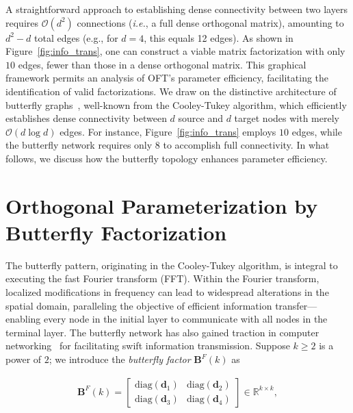 A straightforward approach to establishing dense connectivity between two layers requires $\mathcal{O}(d^2)$ connections (\emph{i.e.}, a full dense orthogonal matrix), amounting to $d^2-d$ total edges (e.g., for $d=4$, this equals 12 edges). As shown in Figure~\ref{fig:info_trans}, one can construct a viable matrix factorization with only $10$ edges, fewer than those in a dense orthogonal matrix. This graphical framework permits an analysis of OFT’s parameter efficiency, facilitating the identification of valid factorizations. We draw on the distinctive architecture of butterfly graphs~\cite{cooley1965algorithm}, well-known from the Cooley-Tukey algorithm, which efficiently establishes dense connectivity between $d$ source and $d$ target nodes with merely $\mathcal{O}(d\log d)$ edges. For instance, Figure~\ref{fig:info_trans} employs $10$ edges, while the butterfly network requires only $8$ to accomplish full connectivity. In what follows, we discuss how the butterfly topology enhances parameter efficiency.

\section{Orthogonal Parameterization by Butterfly Factorization}

The butterfly pattern, originating in the Cooley-Tukey algorithm, is integral to executing the fast Fourier transform (FFT). Within the Fourier transform, localized modifications in frequency can lead to widespread alterations in the spatial domain, paralleling the objective of efficient information transfer—enabling every node in the initial layer to communicate with all nodes in the terminal layer. The butterfly network has also gained traction in computer networking~\cite{solihin2015fundamentals,li2011linear} for facilitating swift information transmission. Suppose $k \geq 2$ is a power of $2$; we introduce the \emph{butterfly factor} $\bm{B}^F(k)$ as

\begin{equation}\label{eq:but_factor}
\begin{aligned}
    \bm{B}^F(k)=\begin{bmatrix}
    \text{diag}(\bm{d}_1) & \text{diag}(\bm{d}_2) \\
    \text{diag}(\bm{d}_3) & \text{diag}(\bm{d}_4)
    \end{bmatrix}\in\mathbb{R}^{k\times k},
\end{aligned}
\end{equation}

